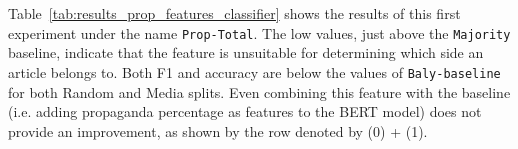 

Table~\ref{tab:results_prop_features_classifier} shows the results of this first experiment under the name \texttt{Prop-Total}. The low values, just above the \texttt{Majority} baseline, indicate that the feature is unsuitable for determining which side an article belongs to. Both F1 and accuracy are below the values of \texttt{Baly-baseline} for both Random and Media splits. Even combining this feature with the baseline (i.e. adding propaganda percentage as features to the BERT model) does not provide an improvement, as shown by the row denoted by (0) + (1).




